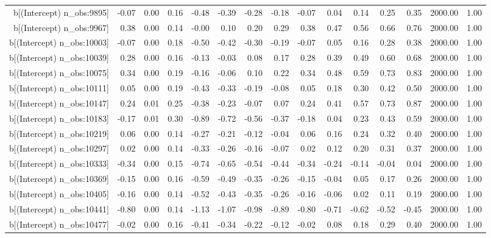 \begin{table}[ht]
\begin{tabular}{rrrrrrrrrrrrrrr}
  b[(Intercept) n\_obs:9895] & -0.07 & 0.00 & 0.16 & -0.48 & -0.39 & -0.28 & -0.18 & -0.07 & 0.04 & 0.14 & 0.25 & 0.35 & 2000.00 & 1.00 \\ 
  b[(Intercept) n\_obs:9967] & 0.38 & 0.00 & 0.14 & -0.00 & 0.10 & 0.20 & 0.29 & 0.38 & 0.47 & 0.56 & 0.66 & 0.76 & 2000.00 & 1.00 \\ 
  b[(Intercept) n\_obs:10003] & -0.07 & 0.00 & 0.18 & -0.50 & -0.42 & -0.30 & -0.19 & -0.07 & 0.05 & 0.16 & 0.28 & 0.38 & 2000.00 & 1.00 \\ 
  b[(Intercept) n\_obs:10039] & 0.28 & 0.00 & 0.16 & -0.13 & -0.03 & 0.08 & 0.17 & 0.28 & 0.39 & 0.49 & 0.60 & 0.68 & 2000.00 & 1.00 \\ 
  b[(Intercept) n\_obs:10075] & 0.34 & 0.00 & 0.19 & -0.16 & -0.06 & 0.10 & 0.22 & 0.34 & 0.48 & 0.59 & 0.73 & 0.83 & 2000.00 & 1.00 \\ 
  b[(Intercept) n\_obs:10111] & 0.05 & 0.00 & 0.19 & -0.43 & -0.33 & -0.19 & -0.08 & 0.05 & 0.18 & 0.30 & 0.42 & 0.50 & 2000.00 & 1.00 \\ 
  b[(Intercept) n\_obs:10147] & 0.24 & 0.01 & 0.25 & -0.38 & -0.23 & -0.07 & 0.07 & 0.24 & 0.41 & 0.57 & 0.73 & 0.87 & 2000.00 & 1.00 \\ 
  b[(Intercept) n\_obs:10183] & -0.17 & 0.01 & 0.30 & -0.89 & -0.72 & -0.56 & -0.37 & -0.18 & 0.04 & 0.23 & 0.43 & 0.59 & 2000.00 & 1.00 \\ 
  b[(Intercept) n\_obs:10219] & 0.06 & 0.00 & 0.14 & -0.27 & -0.21 & -0.12 & -0.04 & 0.06 & 0.16 & 0.24 & 0.32 & 0.40 & 2000.00 & 1.00 \\ 
  b[(Intercept) n\_obs:10297] & 0.02 & 0.00 & 0.14 & -0.33 & -0.26 & -0.16 & -0.07 & 0.02 & 0.12 & 0.20 & 0.31 & 0.37 & 2000.00 & 1.00 \\ 
  b[(Intercept) n\_obs:10333] & -0.34 & 0.00 & 0.15 & -0.74 & -0.65 & -0.54 & -0.44 & -0.34 & -0.24 & -0.14 & -0.04 & 0.04 & 2000.00 & 1.00 \\ 
  b[(Intercept) n\_obs:10369] & -0.15 & 0.00 & 0.16 & -0.59 & -0.49 & -0.35 & -0.26 & -0.15 & -0.04 & 0.05 & 0.17 & 0.26 & 2000.00 & 1.00 \\ 
  b[(Intercept) n\_obs:10405] & -0.16 & 0.00 & 0.14 & -0.52 & -0.43 & -0.35 & -0.26 & -0.16 & -0.06 & 0.02 & 0.11 & 0.19 & 2000.00 & 1.00 \\ 
  b[(Intercept) n\_obs:10441] & -0.80 & 0.00 & 0.14 & -1.13 & -1.07 & -0.98 & -0.89 & -0.80 & -0.71 & -0.62 & -0.52 & -0.45 & 2000.00 & 1.00 \\ 
  b[(Intercept) n\_obs:10477] & -0.02 & 0.00 & 0.16 & -0.41 & -0.34 & -0.22 & -0.12 & -0.02 & 0.08 & 0.18 & 0.29 & 0.40 & 2000.00 & 1.00 \\ 

\end{tabular}
\end{table}
